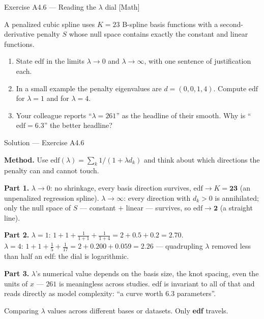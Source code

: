 \documentclass[aspectratio=169,11pt]{beamer}
\begin{document}
\begin{frame}{Exercise A4.6 --- Reading the $\lambda$ dial [Math]}
\begin{exercise}
  A penalized cubic spline uses $K = 23$ B-spline basis functions with a
  second-derivative penalty $S$ whose null space contains exactly the constant and
  linear functions.
  \begin{enumerate}
    \item State $\text{edf}$ in the limits $\lambda \to 0$ and $\lambda \to \infty$,
          with one sentence of justification each.
    \item In a small example the penalty eigenvalues are $d = (0, 0, 1, 4)$. Compute
          $\text{edf}$ for $\lambda = 1$ and for $\lambda = 4$.
    \item Your colleague reports ``$\lambda = 261$'' as the headline of their smooth.
          Why is ``$\text{edf} = 6.3$'' the better headline?
  \end{enumerate}
\end{exercise}
\end{frame}

\begin{frame}{Solution --- Exercise A4.6}
\begin{solutionbox}
  \textbf{Method.} Use $\text{edf}(\lambda) = \sum_k 1/(1+\lambda d_k)$ and think about
  which directions the penalty can and cannot touch.

  \textbf{Part 1.} $\lambda \to 0$: no shrinkage, every basis direction survives,
  $\text{edf} \to K = \mathbf{23}$ (an unpenalized regression spline).
  $\lambda \to \infty$: every direction with $d_k > 0$ is annihilated; only the
  null space of $S$ --- constant $+$ linear --- survives, so
  $\text{edf} \to \mathbf{2}$ (a straight line).

  \textbf{Part 2.} $\lambda = 1$:
  $1 + 1 + \tfrac{1}{1+1} + \tfrac{1}{1+4} = 2 + 0.5 + 0.2 = \mathbf{2.70}$.\\
  $\lambda = 4$:
  $1 + 1 + \tfrac{1}{5} + \tfrac{1}{17} = 2 + 0.200 + 0.059 = \mathbf{2.26}$ ---
  quadrupling $\lambda$ removed less than half an edf: the dial is logarithmic.

  \textbf{Part 3.} $\lambda$'s numerical value depends on the basis size, the knot
  spacing, even the units of $x$ --- $261$ is meaningless across studies. edf is
  invariant to all of that and reads directly as model complexity:
  ``a curve worth $6.3$ parameters''.
\end{solutionbox}
\begin{mistake}
  Comparing $\lambda$ values across different bases or datasets. Only \textbf{edf}
  travels.
\end{mistake}
\end{frame}
\end{document}
